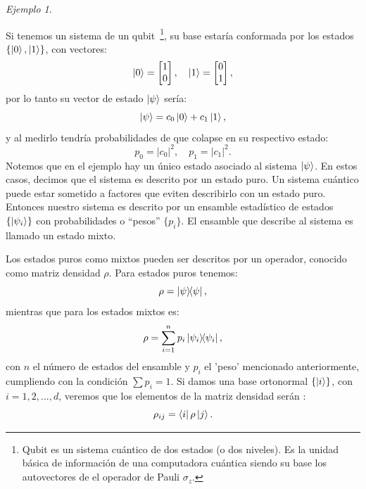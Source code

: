 \documentclass[letterpaper,12pt]{thesisECFM}
\theoremstyle{plain}
\theoremstyle{definition}
\theoremstyle{definition}
\theoremstyle{remark}
\newcommand{\1}{\mathbb{1}}
\newtheorem{ex}{Ejemplo}[section]
\begin{document}
\begin{ex} \label{ex: dens1}\end{ex} Si tenemos un sistema de un
qubit~\footnote{Qubit es un sistema cuántico de dos estados (o dos niveles). Es
la
unidad básica de información de una computadora cuántica siendo su base los
autovectores de el operador de Pauli 
$\sigma_z$.}, su base estaría conformada
por los estados $\{{\ket{0},\ket{1}}\}$, con vectores:
\begin{equation}
\ket{0} = \begin{bmatrix} 
    1 \\
    0 \\
    \end{bmatrix}, \quad \ket{1}=\begin{bmatrix} 
    0 \\
    1 \\
    \end{bmatrix},     
\end{equation} 
    por lo tanto su vector de estado $\ket{\psi}$ sería:
    \begin{equation}
      \ket{\psi} = c_0 \ket{0} + c_1 \ket{1},   
    \end{equation}
    y al medirlo tendría probabilidades de que colapse en su respectivo estado:
    \begin{equation}
     p_0=|c_0|^2, \quad p_1=|c_1|^2.
    \end{equation}
Notemos que en el ejemplo hay un único estado asociado al sistema $\ket{\psi}$.
En estos casos, decimos que el sistema es descrito por un estado puro.
Un sistema cuántico puede estar sometido a factores que eviten describirlo con
un estado puro.  Entonces nuestro sistema es descrito por un ensamble
estadístico de estados $\{\ket{\psi_i} \}$  con probabilidades o ``pesos''
$\{p_i\}$. El ensamble que describe al sistema  es llamado un estado mixto.

Los estados puros como mixtos pueden ser descritos por un operador,
conocido como matriz densidad $\rho$. Para estados puros tenemos:
    \begin{equation}
        \label{ec:dens_puros}
        \rho = \ketbra{\psi},
    \end{equation}
mientras que para los estados mixtos es:
\begin{equation}
\label{dens_mixtos}
    \rho = \sum_{i=1}^{n} p_i \ketbra{\psi_i},
\end{equation}
con $n$ el número de estados del ensamble y $p_i$ el 'peso' mencionado
anteriormente, cumpliendo con la condición $\sum p_i =1$.
Si damos una base ortonormal $\{\ket{i}\}$, con $i=1,2,...,d$, veremos que los elementos de la
matriz densidad serán \cite{princip_quantum}:
\begin{equation}
    \label{eq:rho_ij}
    \rho_{ij} = \bra{i} \rho \ket{j}.
\end{equation}
   
\end{document}
